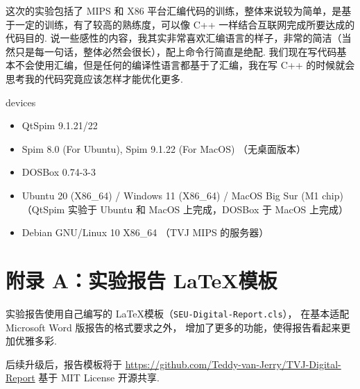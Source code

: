 \documentclass[11pt]{SEU-Digital-Report}
\begin{document}
    这次的实验包括了 MIPS 和 X86 平台汇编代码的训练，整体来说较为简单，是基于一定的训练，有了较高的熟练度，可以像 C++ 一样结合互联网完成所要达成的代码目的.
    说一些感性的内容，我其实非常喜欢汇编语言的样子，非常的简洁（当然只是每一句话，整体必然会很长），配上命令行简直是绝配.
    我们现在写代码基本不会使用汇编，但是任何的编译性语言都基于了汇编，我在写 C++ 的时候就会思考我的代码究竟应该怎样才能优化更多.

    \begin{device}{}{devices}
      \begin{itemize}
        \item QtSpim 9.1.21/22
        \item Spim 8.0 (For Ubuntu), Spim 9.1.22 (For MacOS) {\kaishu\color{gray}（无桌面版本）}
        \item DOSBox 0.74-3-3
        \item Ubuntu 20 (X86\_64) / Windows 11 (X86\_64) / MacOS Big Sur (M1 chip){\kaishu\color{gray}（QtSpim 实验于 Ubuntu 和 MacOS 上完成，DOSBox 于 MacOS 上完成）}
        \item Debian GNU/Linux 10 X86\_64 {\kaishu\color{gray}（TVJ MIPS 的服务器）}
      \end{itemize}
    \end{device}
    

    \printbibliography[sorting=none]

    \newpage
    \section*{附录 A：实验报告 \LaTeX 模板}

        实验报告使用自己编写的 \LaTeX 模板（\texttt{SEU-Digital-Report.cls}），
        在基本适配 Microsoft Word 版报告的格式要求之外，
        增加了更多的功能，使得报告看起来更加优雅多彩.

        后续升级后，报告模板将于 \url{https://github.com/Teddy-van-Jerry/TVJ-Digital-Report} 基于 MIT License 开源共享.
\end{document}
